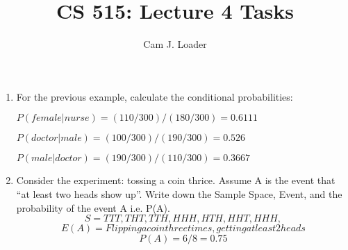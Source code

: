 \documentclass[12pt]{article}
\title{CS 515: Lecture 4 Tasks}
\author{Cam J. Loader}
\begin{document}
\maketitle

\begin{enumerate}
    \item For the previous example, calculate the conditional probabilities:
    \begin{enumerate} 
        \begin{center}
            $P(female | nurse) = (110/300)/(180/300) =  0.6111$
        \end{center}
        \begin{center}
            $P(doctor | male) = (100/300)/(190/300) = 0.526$
        \end{center}
        \begin{center}
            $P(male | doctor) = (190/300)/(110/300) = 0.3667$
        \end{center}
    \end{enumerate}
    \item Consider the experiment: tossing a coin thrice. Assume A is the event that “at least two heads
          show up”. Write down the Sample Space, Event, and the probability of the event A i.e. P(A).
               $$S = {TTT, THT, TTH, HHH, HTH, HHT, HHH, }$$
               $$E(A) = {Flipping a coin three times, getting at least 2 heads}$$
               $$P(A) = 6/8 = 0.75 $$
\end{enumerate}
\end{document}
